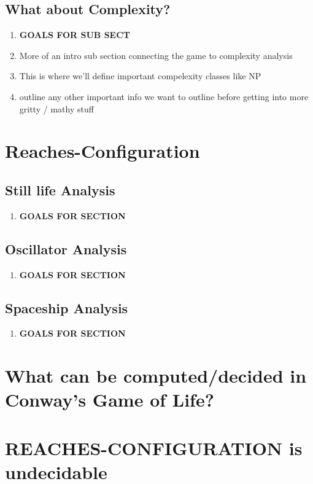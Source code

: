 \documentclass{article}
\theoremstyle{definition}
\theoremstyle{plain}
\theoremstyle{plain}
\begin{document}
\subsection{What about Complexity?}
\begin{enumerate}
  \item[] \textbf{GOALS FOR SUB SECT}
  \item More of an intro sub section connecting the game to complexity analysis  
  \item This is where we'll define important compelexity classes like NP
  \item outline any other important info we want to outline before getting into more gritty / mathy stuff

\end{enumerate}

\section{Reaches-Configuration}

\subsection{Still life Analysis}
\begin{enumerate}
  \item[] \textbf{GOALS FOR SECTION}
\end{enumerate}

\subsection{Oscillator Analysis}
\begin{enumerate}
  \item[] \textbf{GOALS FOR SECTION}
\end{enumerate}

\subsection{Spaceship Analysis}
\begin{enumerate}
  \item[] \textbf{GOALS FOR SECTION}
\end{enumerate}

\section{What can be computed/decided in Conway’s Game of Life?}

\section{REACHES-CONFIGURATION is undecidable}

\printbibliography
\end{document}
